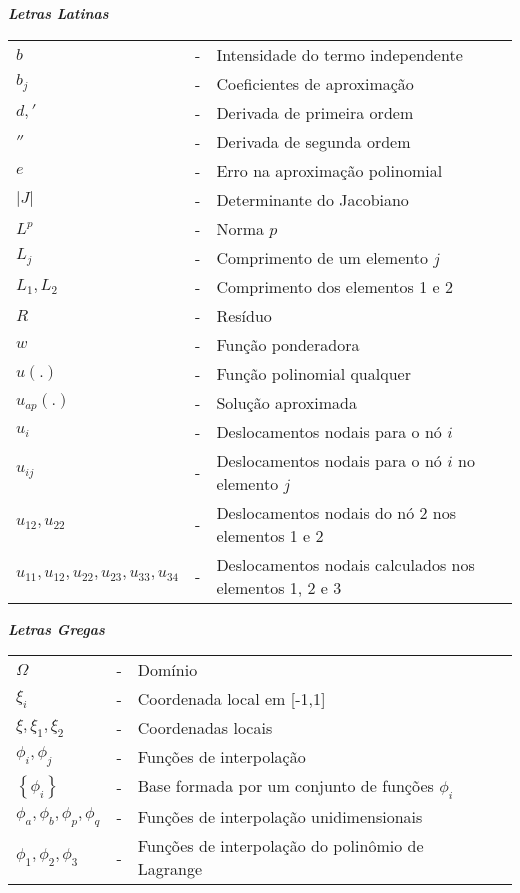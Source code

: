 \textbf{\emph{Letras Latinas}}\\

\noindent
\begin{tabular}{l c p{.6\linewidth} c}
$b$ & - & Intensidade do termo independente\\
$b_{j}$ & - & Coeficientes de aproximação\\
$d, {}'$ & - & Derivada de primeira ordem\\
${}''$ & - & Derivada de segunda ordem\\
$e$ & - & Erro na aproximação polinomial\\
$\left | J \right |$ & - & Determinante do Jacobiano\\
$L^{p}$ & - & Norma $p$\\
$L_{j}$ & - & Comprimento de um elemento $j$\\
$L_{1}, L_{2}$ & - & Comprimento dos elementos 1 e 2\\
$R$ & - & Resíduo\\$w$ & - & Função ponderadora\\
$u(.)$ & - & Função polinomial qualquer\\
$u_{ap}(.)$ & - & Solução aproximada\\
$u_{i}$ & - & Deslocamentos nodais para o nó $i$\\
$u_{ij}$ & - & Deslocamentos nodais para o nó $i$ no elemento $j$\\
$u_{12}, u_{22}$ & - & Deslocamentos nodais do nó 2 nos elementos 1 e 2\\
$u_{11}, u_{12}, u_{22}, u_{23}, u_{33}, u_{34}$ & - & Deslocamentos nodais calculados nos
elementos 1, 2 e 3\\
\end{tabular}
\newline \newline


\textbf{\emph{Letras Gregas}}\\

\noindent
\begin{tabular}{l c p{.6\linewidth} l}
$\Omega$ & - & Domínio\\
$\xi_{i}$ & - & Coordenada local em [-1,1]\\
$\xi, \xi_{1}, \xi_{2}$ & - & Coordenadas locais\\
$\phi_{i},\phi_{j}$ & - & Funções de interpolação\\
$\left\{ \phi_{i} \right\}$ & - & Base formada por um conjunto de funções $\phi_{i}$\\
$\phi_{a}, \phi_{b}, \phi_{p}, \phi_{q} $& - & Funções de interpolação unidimensionais\\
$\phi_{1}, \phi_{2}, \phi_{3}	$& - & Funções de interpolação do polinômio de Lagrange\\
\end{tabular}


